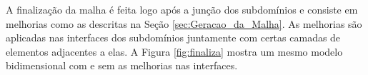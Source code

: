 A finalização da malha é feita logo após a junção dos subdomínios e consiste em melhorias como as descritas na Seção \ref{sec:Geracao_da_Malha}. As melhorias são aplicadas nas interfaces dos subdomínios juntamente com certas camadas de elementos adjacentes a elas. A Figura \ref{fig:finaliza} mostra um mesmo modelo bidimensional com e sem as melhorias nas interfaces.

\begin{figure}[!ht]
	\centering
	\qquad
\end{figure}
